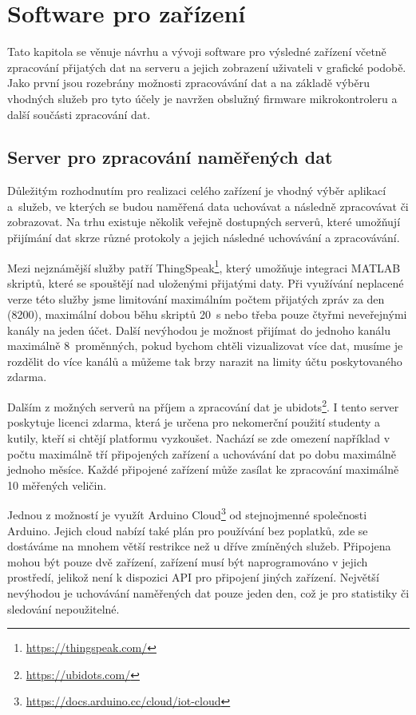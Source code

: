 \chapter{Software pro zařízení}

Tato kapitola se věnuje návrhu a vývoji software pro výsledné zařízení včetně zpracování přijatých dat na serveru a jejich zobrazení uživateli v grafické podobě. Jako první jsou rozebrány možnosti zpracovávání dat a na základě výběru vhodných služeb pro tyto účely je navržen obslužný firmware mikrokontroleru a další součásti zpracování dat.

\section{Server pro zpracování naměřených dat}

Důležitým rozhodnutím pro realizaci celého zařízení je vhodný výběr aplikací a~služeb, ve kterých se budou naměřená data uchovávat a následně zpracovávat či zobrazovat. Na trhu existuje několik veřejně dostupných serverů, které umožňují přijímání dat skrze různé protokoly a jejich následné uchovávání a zpracovávání.

Mezi nejznámější služby patří ThingSpeak\footnote{\url{https://thingspeak.com/}}, který umožňuje integraci MATLAB skriptů, které se spouštějí nad uloženými přijatými daty. Při využívání neplacené verze této služby jsme limitování maximálním počtem přijatých zpráv za den (\SI{8200}{}), maximální dobou běhu skriptů \SI{20}{\second} nebo třeba pouze čtyřmi neveřejnými kanály na jeden účet. Další nevýhodou je možnost přijímat do jednoho kanálu maximálně 8~proměnných, pokud bychom chtěli vizualizovat více dat, musíme je rozdělit do více kanálů a můžeme tak brzy narazit na limity účtu poskytovaného zdarma.

Dalším z možných serverů na příjem a zpracování dat je ubidots\footnote{\url{https://ubidots.com/}}. I tento server poskytuje licenci zdarma, která je určena pro nekomerční použití studenty a kutily, kteří si chtějí platformu vyzkoušet. Nachází se zde omezení například v počtu maximálně tří připojených zařízení a uchovávání dat po dobu maximálně jednoho měsíce. Každé připojené zařízení může zasílat ke zpracování maximálně \SI{10}{} měřených veličin.

Jednou z možností je využít Arduino Cloud\footnote{\url{https://docs.arduino.cc/cloud/iot-cloud}} od stejnojmenné společnosti Arduino. Jejich cloud nabízí také plán pro používání bez poplatků, zde se dostáváme na mnohem větší restrikce než u dříve zmíněných služeb. Připojena mohou být pouze dvě zařízení, zařízení musí být naprogramováno v jejich prostředí, jelikož není k dispozici API pro připojení jiných zařízení. Největší nevýhodou je uchovávání naměřených dat pouze jeden den, což je pro statistiky či sledování nepoužitelné.

